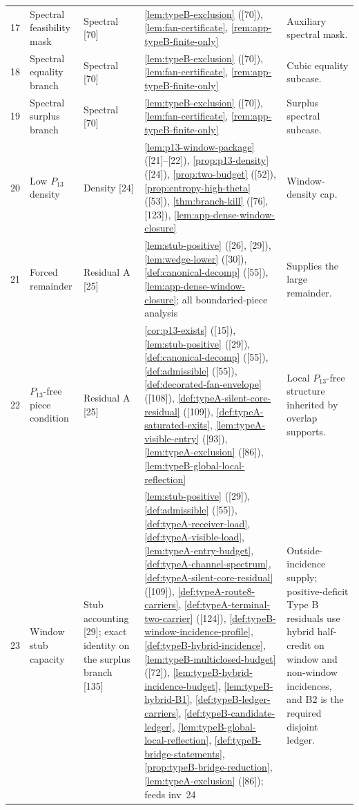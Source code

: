 \documentclass[11pt]{article}
\begin{document}
{\begin{longtable}{C{0.032\textwidth} L{0.145\textwidth} L{0.105\textwidth} L{0.50\textwidth} L{0.155\textwidth}}
17 & Spectral feasibility mask & Spectral {[70]} & \cref{lem:typeB-exclusion} ([70]), \cref{lem:fan-certificate}, \cref{rem:app-typeB-finite-only} & Auxiliary spectral mask. \\
18 & Spectral equality branch & Spectral {[70]} & \cref{lem:typeB-exclusion} ([70]), \cref{lem:fan-certificate}, \cref{rem:app-typeB-finite-only} & Cubic equality subcase. \\
19 & Spectral surplus branch & Spectral {[70]} & \cref{lem:typeB-exclusion} ([70]), \cref{lem:fan-certificate}, \cref{rem:app-typeB-finite-only} & Surplus spectral subcase. \\
20 & Low $P_{13}$ density & Density {[24]} & \cref{lem:p13-window-package} ([21]--[22]), \cref{prop:p13-density} ([24]), \cref{prop:two-budget} ([52]), \cref{prop:entropy-high-theta} ([53]), \cref{thm:branch-kill} ([76], [123]), \cref{lem:app-dense-window-closure} & Window-density cap. \\
21 & Forced remainder & Residual A {[25]} & \cref{lem:stub-positive} ([26], [29]), \cref{lem:wedge-lower} ([30]), \cref{def:canonical-decomp} ([55]), \cref{lem:app-dense-window-closure}; all boundaried-piece analysis & Supplies the large remainder. \\
22 & $P_{13}$-free piece condition & Residual A {[25]} & \cref{cor:p13-exists} ([15]), \cref{lem:stub-positive} ([29]), \cref{def:canonical-decomp} ([55]), \cref{def:admissible} ([55]), \cref{def:decorated-fan-envelope} ([108]), \cref{def:typeA-silent-core-residual} ([109]), \cref{def:typeA-saturated-exits}, \cref{lem:typeA-visible-entry} ([93]), \cref{lem:typeA-exclusion} ([86]), \cref{lem:typeB-global-local-reflection} & Local $P_{13}$-free structure inherited by overlap supports. \\
23 & Window stub capacity & Stub accounting {[29]}; exact identity on the surplus branch {[135]} & \cref{lem:stub-positive} ([29]), \cref{def:admissible} ([55]), \cref{def:typeA-receiver-load}, \cref{def:typeA-visible-load}, \cref{lem:typeA-entry-budget}, \cref{def:typeA-channel-spectrum}, \cref{def:typeA-silent-core-residual} ([109]), \cref{def:typeA-route8-carriers}, \cref{def:typeA-terminal-two-carrier} ([124]), \cref{def:typeB-window-incidence-profile}, \cref{def:typeB-hybrid-incidence}, \cref{lem:typeB-multiclosed-budget} ([72]), \cref{lem:typeB-hybrid-incidence-budget}, \cref{lem:typeB-hybrid-B1}, \cref{def:typeB-ledger-carriers}, \cref{def:typeB-candidate-ledger}, \cref{lem:typeB-global-local-reflection}, \cref{def:typeB-bridge-statements}, \cref{prop:typeB-bridge-reduction}, \cref{lem:typeA-exclusion} ([86]); feeds inv~24 & Outside-incidence supply; positive-deficit Type B residuals use hybrid half-credit on window and non-window incidences, and B2 is the required disjoint ledger. \\

\end{longtable}}
\end{document}
